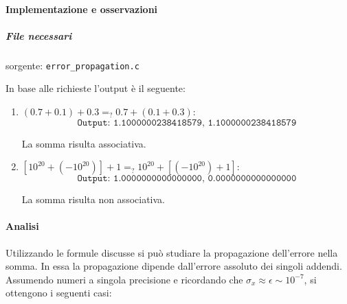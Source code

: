 \paragraph{Implementazione e osservazioni}

\subparagraph{File necessari} sorgente: \texttt{error\_propagation.c}

In base alle richieste l'output è il seguente:

\begin{enumerate}

	\item $(0.7 + 0.1) + 0.3 =_? 0.7 + (0.1 + 0.3)$:
	      $$\texttt{Output: 1.1000000238418579, 1.1000000238418579}$$

	      La somma risulta associativa.

	\item $[10^{20} + (-10^{20})] + 1 =_? 10^{20} + [(-10^{20}) + 1]$:
	      $$\texttt{Output: 1.0000000000000000, 0.0000000000000000}$$

	      La somma risulta non associativa.
\end{enumerate}

\label{sec:propagation}
\paragraph{Analisi}

Utilizzando le formule discusse si può studiare la propagazione dell’errore nella somma.
In essa la propagazione dipende dall’errore assoluto dei singoli addendi.
Assumendo numeri a singola precisione e ricordando che $ \sigma_x \approx \epsilon \sim 10^{-7}$,
si ottengono i seguenti casi:

